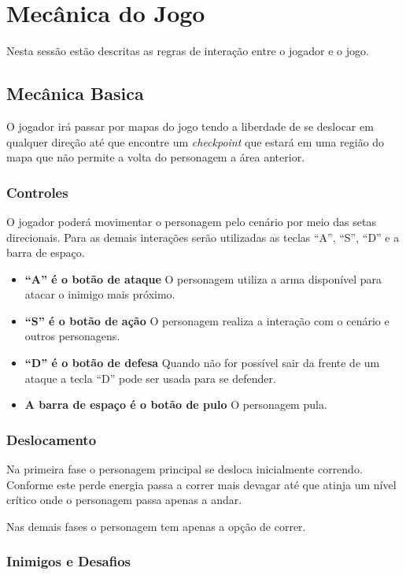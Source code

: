 \section{Mecânica do Jogo}


Nesta sessão estão descritas as regras de interação entre o jogador e o jogo.

\subsection {Mecânica Basica}

O jogador irá passar por mapas do jogo tendo a liberdade de se deslocar em
 qualquer direção até que encontre um \textit{checkpoint} que estará em uma região
 do mapa que não permite a volta do personagem a área anterior.

\subsubsection {Controles}

O jogador poderá movimentar o personagem pelo cenário por meio das setas
 direcionais. Para as demais interações serão utilizadas as teclas
 ``A'', ``S'', ``D'' e a barra de espaço.
\begin{itemize}
\item {\bf ``A'' é o botão de ataque} O personagem utiliza a arma disponível
para atacar o inimigo mais próximo.
\item {\bf ``S'' é o botão de ação} O personagem realiza a interação com o
 cenário e outros personagens.
\item {\bf ``D'' é o botão de defesa} Quando não for possível sair da frente
 de um ataque a tecla ``D'' pode ser usada para se defender.
\item {\bf A barra de espaço é o botão de pulo} O personagem pula.
\end{itemize}

\subsubsection {Deslocamento}

Na primeira fase o personagem principal se desloca inicialmente correndo. Conforme este 
perde energia passa a correr mais devagar até que atinja um nível crítico
onde o personagem passa apenas a andar.

Nas demais fases o personagem tem apenas a opção de correr.

\subsubsection {Inimigos e Desafios}

